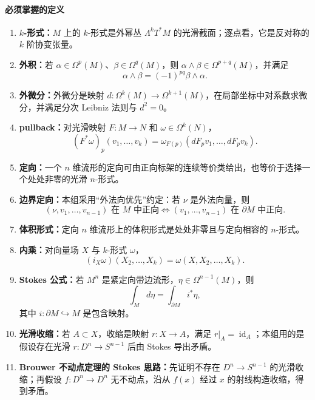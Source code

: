\documentclass[12pt,a4paper]{ctexart}
\newcommand{\id}{\operatorname{id}}
\begin{document}
\paragraph{必须掌握的定义}
\begin{enumerate}
  \item \textbf{$k$-形式：}$M$ 上的 $k$-形式是外幂丛 $\Lambda^kT^*M$ 的光滑截面；逐点看，它是反对称的 $k$ 阶协变张量。
  \item \textbf{外积：}若 $\alpha\in\Omega^p(M)$、$\beta\in\Omega^q(M)$，则 $\alpha\wedge\beta\in\Omega^{p+q}(M)$，并满足
  \[
    \alpha\wedge\beta=(-1)^{pq}\beta\wedge\alpha.
  \]
  \item \textbf{外微分：}外微分是映射 $d:\Omega^k(M)\to\Omega^{k+1}(M)$，在局部坐标中对系数求微分，并满足分次 Leibniz 法则与 $d^2=0$。
  \item \textbf{pullback：}对光滑映射 $F:M\to N$ 和 $\omega\in\Omega^k(N)$，
  \[
    (F^*\omega)_p(v_1,\ldots,v_k)
    =
    \omega_{F(p)}(dF_pv_1,\ldots,dF_pv_k).
  \]
  \item \textbf{定向：}一个 $n$ 维流形的定向可由正向标架的连续等价类给出，也等价于选择一个处处非零的光滑 $n$-形式。
  \item \textbf{边界定向：}本组采用“外法向优先”约定：若 $\nu$ 是外法向量，则
  \[
    (\nu,v_1,\ldots,v_{n-1})\text{ 在 }M\text{ 中正向}
    \Longleftrightarrow
    (v_1,\ldots,v_{n-1})\text{ 在 }\partial M\text{ 中正向}.
  \]
  \item \textbf{体积形式：}定向 $n$ 维流形上的体积形式是处处非零且与定向相容的 $n$-形式。
  \item \textbf{内乘：}对向量场 $X$ 与 $k$-形式 $\omega$，
  \[
    (i_X\omega)(X_2,\ldots,X_k)=\omega(X,X_2,\ldots,X_k).
  \]
  \item \textbf{Stokes 公式：}若 $M^n$ 是紧定向带边流形，$\eta\in\Omega^{n-1}(M)$，则
  \[
    \int_M d\eta=\int_{\partial M}i^*\eta,
  \]
  其中 $i:\partial M\hookrightarrow M$ 是包含映射。
  \item \textbf{光滑收缩：}若 $A\subset X$，收缩是映射 $r:X\to A$，满足 $r|_A=\id_A$；本组用的是假设存在光滑 $r:D^n\to S^{n-1}$ 后由 Stokes 导出矛盾。
  \item \textbf{Brouwer 不动点定理的 Stokes 思路：}先证明不存在 $D^n\to S^{n-1}$ 的光滑收缩；再假设 $f:D^n\to D^n$ 无不动点，沿从 $f(x)$ 经过 $x$ 的射线构造收缩，得到矛盾。
\end{enumerate}
\end{document}
